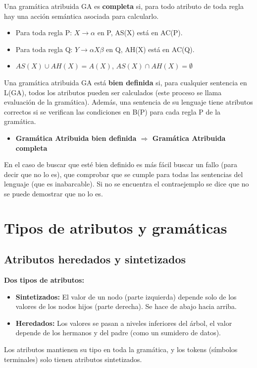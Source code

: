 \documentclass[12pt, twoside, openright]{report} %
\begin{document}
Una gramática atribuida GA es \textbf{completa} si, para todo atributo de toda regla hay una acción semántica asociada para calcularlo.
\begin{itemize}
  \item Para toda regla P: $X\rightarrow\alpha$ en P, AS(X) está en AC(P).
  \item Para toda regla Q: $Y\rightarrow\alpha X \beta$ en Q, AH(X) está en AC(Q).
  \item $AS(X) \cup AH(X) = A(X)$, $AS(X) \cap AH(X)=\emptyset$
\end{itemize}

Una gramática atribuida GA está \textbf{bien definida} si, para cualquier sentencia en L(GA), todos los atributos pueden ser calculados (este proceso se llama evaluación de la gramática). Además, una sentencia de su lenguaje tiene atributos correctos si se verifican las condiciones en B(P) para cada regla P de la gramática.
\begin{itemize}
  \item \textbf{Gramática Atribuida bien definida $\Rightarrow$ Gramática Atribuida completa}
\end{itemize}
En el caso de buscar que esté bien definido es más fácil buscar un fallo (para decir que no lo es), que comprobar que se cumple para todas las sentencias del lenguaje (que es inabarcable). Si no se encuentra el contraejemplo se dice que no se puede demostrar que no lo es.

\section{Tipos de atributos y gramáticas}
\subsection{Atributos heredados y sintetizados}
\begin{figure}[H]
  {\def\svgwidth{.9\textwidth}
  }
\end{figure}
\textbf{Dos tipos de atributos:}
\begin{itemize}
  \item \textbf{Sintetizados:} El valor de un nodo (parte izquierda) depende solo de los valores de los nodos hijos (parte derecha). Se hace de abajo hacia arriba.

  \item \textbf{Heredados:} Los valores se pasan a niveles inferiores del árbol, el valor depende de los hermanos y del padre (como un sumidero de datos).

\end{itemize}
Los atributos mantienen su tipo en toda la gramática, y los tokens (símbolos terminales) solo tienen atributos sintetizados.
\end{document}

